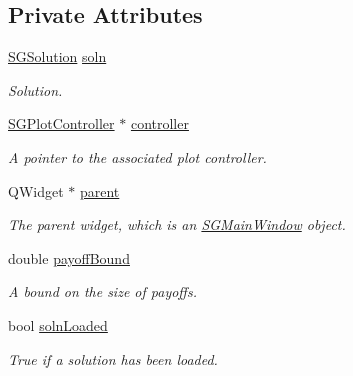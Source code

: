 \subsection*{Private Attributes}
\begin{DoxyCompactItemize}
\item 
\hyperlink{classSGSolution}{S\+G\+Solution} \hyperlink{classSGSolutionHandler_a9d13b2690f62b56e3457e0b9a5dfea0d}{soln}
\begin{DoxyCompactList}\small\item\em Solution. \end{DoxyCompactList}\item 
\mbox{\label{classSGSolutionHandler_ac3572b35e3e3f637b4542a8ff280291f}} 
\hyperlink{classSGPlotController}{S\+G\+Plot\+Controller} $\ast$ \hyperlink{classSGSolutionHandler_ac3572b35e3e3f637b4542a8ff280291f}{controller}
\begin{DoxyCompactList}\small\item\em A pointer to the associated plot controller. \end{DoxyCompactList}\item 
\mbox{\label{classSGSolutionHandler_acad6ff1e5871e5956d56ef11160c5659}} 
Q\+Widget $\ast$ \hyperlink{classSGSolutionHandler_acad6ff1e5871e5956d56ef11160c5659}{parent}
\begin{DoxyCompactList}\small\item\em The parent widget, which is an \hyperlink{classSGMainWindow}{S\+G\+Main\+Window} object. \end{DoxyCompactList}\item 
\mbox{\label{classSGSolutionHandler_a898a83847430d5a15b66b6ffec934aaf}} 
double \hyperlink{classSGSolutionHandler_a898a83847430d5a15b66b6ffec934aaf}{payoff\+Bound}
\begin{DoxyCompactList}\small\item\em A bound on the size of payoffs. \end{DoxyCompactList}\item 
\mbox{\label{classSGSolutionHandler_a51a229e0dad9a61b720fcd80b89492ef}} 
bool \hyperlink{classSGSolutionHandler_a51a229e0dad9a61b720fcd80b89492ef}{soln\+Loaded}
\begin{DoxyCompactList}\small\item\em True if a solution has been loaded. \end{DoxyCompactList}\item 

\end{DoxyCompactItemize}
